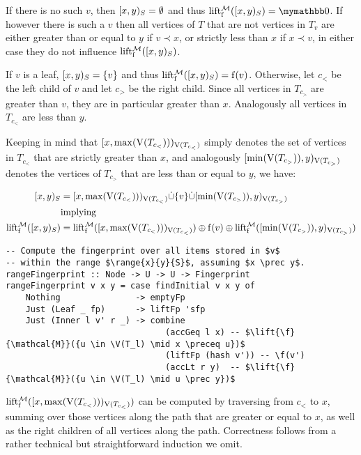 If there is no such $v$, then $[{x},{y})_{S} = \emptyset$ and thus $\lift{\f}{\mathcal{M}}(\range{x}{y}{S}) = \neutraladd$. If however there is such a $v$ then all vertices of $T$ that are not vertices in $T_v$ are either greater than or equal to $y$ if $v \prec x$, or strictly less than $x$ if $x \prec v$, in either case they do not influence $\operatorname{lift_{\operatorname{f}}^{\mathcal{M}}}([{x},{y})_{S})$.

If $v$ is a leaf, $[{x},{y})_{S} = \{v\}$ and thus $\operatorname{lift_{\operatorname{f}}^{\mathcal{M}}}([{x},{y})_{S}) = \operatorname{f}(v)$. Otherwise, let $c_{<}$ be the left child of $v$ and let $c_{>}$ be the right child. Since all vertices in $T_{c_{>}}$ are greater than $v$, they are in particular greater than $x$. Analogously all vertices in $T_{c_{<}}$ are less than $y$.

Keeping in mind that $[{x},{\max(\operatorname{V}(T_{c_{<}}))})_{\operatorname{V}(T_{c_{<}})}$ simply denotes the set of vertices in $T_{c_{<}}$ that are strictly greater than $x$, and analogously $[{\min(\operatorname{V}(T_{c_{>}}))},{y})_{\operatorname{V}(T_{c_{>}})}$ denotes the vertices of $T_{c_{>}}$ that are less than or equal to $y$, we have:

\begin{align*}
[{x},{y})_{S} &= {[{x},{\max(\operatorname{V}(T_{c_{<}}))})_{\operatorname{V}(T_{c_{<}})}} \dot{\cup} {{\{v\}} \dot{\cup} {[{\min(\operatorname{V}(T_{c_{>}}))},{y})_{\operatorname{V}(T_{c_{>}})}}}\\
&\mathrm{implying}\\
\operatorname{lift_{\operatorname{f}}^{\mathcal{M}}}([{x},{y})_{S}) &= {\operatorname{lift_{\operatorname{f}}^{\mathcal{M}}}([{x},{\max(\operatorname{V}(T_{c_{<}}))})_{\operatorname{V}(T_{c_{<}})})} \oplus {{\operatorname{f}(v)} \oplus{\operatorname{lift_{\operatorname{f}}^{\mathcal{M}}}([{\min(\operatorname{V}(T_{c_{>}}))},{y})_{\operatorname{V}(T_{c_{>}})})}}\\
\end{align*}

\begin{verbatim}
-- Compute the fingerprint over all items stored in $v$
-- within the range $\range{x}{y}{S}$, assuming $x \prec y$.
rangeFingerprint :: Node -> U -> U -> Fingerprint
rangeFingerprint v x y = case findInitial v x y of
    Nothing               -> emptyFp
    Just (Leaf _ fp)      -> liftFp 'sfp
    Just (Inner l v' r _) -> combine
                                (accGeq l x) -- $\lift{\f}{\mathcal{M}}({u \in \V(T_l) \mid x \preceq u})$
                                (liftFp (hash v')) -- \f(v')
                                (accLt r y)  -- $\lift{\f}{\mathcal{M}}({u \in \V(T_l) \mid u \prec y})$
\end{verbatim}

$\operatorname{lift_{\operatorname{f}}^{\mathcal{M}}}([{x},{\max(\operatorname{V}(T_{c_{<}}))})_{\operatorname{V}(T_{c_{<}})})$ can be computed by traversing from $c_{<}$ to $x$, summing over those vertices along the path that are greater or equal to $x$, as well as the right children of all vertices along the path. Correctness follows from a rather technical but straightforward induction we omit.

